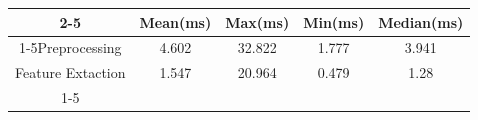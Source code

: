 \documentclass{standalone}
\begin{document}
 
 \begin{tabular}{|c |c |c |c |c |}
\cline{2-5}\cline{2-5} \multicolumn{1}{c |}{ } & Mean(ms) & Max(ms) & Min(ms) & Median(ms)\\ 
\cline{1-5}Preprocessing & 4.602 & 32.822 & 1.777 & 3.941\\ 
 \hhline{|=|=|=|=|=|}Feature Extaction & 1.547 & 20.964 & 0.479 & 1.28\\ 
 \cline{1-5}\hline \end{tabular}
 
\end{document}
